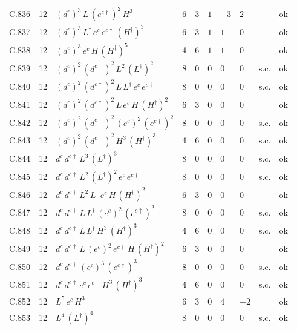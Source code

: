 {\begin{longtable}{@{}ll>{\raggedright\arraybackslash}p{6.4cm}rrllllr@{}}
C.836 & 12 & $(d^c)^{3}\,L\,(e^{c\dagger})^{2}\,H^{3}$ & 6 & 3 & $1$ & $-3$ & $2$ &  & ok \\
C.837 & 12 & $(d^c)^{3}\,L^\dagger\,e^c\,e^{c\dagger}\,(H^\dagger)^{3}$ & 6 & 3 & $1$ & $1$ & $0$ &  & ok \\
C.838 & 12 & $(d^c)^{3}\,e^c\,H\,(H^\dagger)^{5}$ & 4 & 6 & $1$ & $1$ & $0$ &  & ok \\
C.839 & 12 & $(d^c)^{2}\,(d^{c\dagger})^{2}\,L^{2}\,(L^\dagger)^{2}$ & 8 & 0 & $0$ & $0$ & $0$ & s.c. & ok \\
C.840 & 12 & $(d^c)^{2}\,(d^{c\dagger})^{2}\,L\,L^\dagger\,e^c\,e^{c\dagger}$ & 8 & 0 & $0$ & $0$ & $0$ & s.c. & ok \\
C.841 & 12 & $(d^c)^{2}\,(d^{c\dagger})^{2}\,L\,e^c\,H\,(H^\dagger)^{2}$ & 6 & 3 & $0$ & $0$ & $0$ &  & ok \\
C.842 & 12 & $(d^c)^{2}\,(d^{c\dagger})^{2}\,(e^c)^{2}\,(e^{c\dagger})^{2}$ & 8 & 0 & $0$ & $0$ & $0$ & s.c. & ok \\
C.843 & 12 & $(d^c)^{2}\,(d^{c\dagger})^{2}\,H^{3}\,(H^\dagger)^{3}$ & 4 & 6 & $0$ & $0$ & $0$ & s.c. & ok \\
C.844 & 12 & $d^c\,d^{c\dagger}\,L^{3}\,(L^\dagger)^{3}$ & 8 & 0 & $0$ & $0$ & $0$ & s.c. & ok \\
C.845 & 12 & $d^c\,d^{c\dagger}\,L^{2}\,(L^\dagger)^{2}\,e^c\,e^{c\dagger}$ & 8 & 0 & $0$ & $0$ & $0$ & s.c. & ok \\
C.846 & 12 & $d^c\,d^{c\dagger}\,L^{2}\,L^\dagger\,e^c\,H\,(H^\dagger)^{2}$ & 6 & 3 & $0$ & $0$ & $0$ &  & ok \\
C.847 & 12 & $d^c\,d^{c\dagger}\,L\,L^\dagger\,(e^c)^{2}\,(e^{c\dagger})^{2}$ & 8 & 0 & $0$ & $0$ & $0$ & s.c. & ok \\
C.848 & 12 & $d^c\,d^{c\dagger}\,L\,L^\dagger\,H^{3}\,(H^\dagger)^{3}$ & 4 & 6 & $0$ & $0$ & $0$ & s.c. & ok \\
C.849 & 12 & $d^c\,d^{c\dagger}\,L\,(e^c)^{2}\,e^{c\dagger}\,H\,(H^\dagger)^{2}$ & 6 & 3 & $0$ & $0$ & $0$ &  & ok \\
C.850 & 12 & $d^c\,d^{c\dagger}\,(e^c)^{3}\,(e^{c\dagger})^{3}$ & 8 & 0 & $0$ & $0$ & $0$ & s.c. & ok \\
C.851 & 12 & $d^c\,d^{c\dagger}\,e^c\,e^{c\dagger}\,H^{3}\,(H^\dagger)^{3}$ & 4 & 6 & $0$ & $0$ & $0$ & s.c. & ok \\
C.852 & 12 & $L^{5}\,e^c\,H^{3}$ & 6 & 3 & $0$ & $4$ & $-2$ &  & ok \\
C.853 & 12 & $L^{4}\,(L^\dagger)^{4}$ & 8 & 0 & $0$ & $0$ & $0$ & s.c. & ok \\

\end{longtable}}
